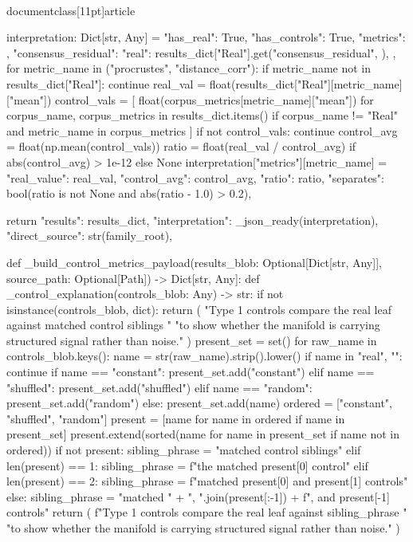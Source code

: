 \\documentclass[11pt]{article}
\begin{document}
\begin{CodeBlock}
    interpretation: Dict[str, Any] = {
        "has_real": True,
        "has_controls": True,
        "metrics": {},
        "consensus_residual": {
            "real": results_dict["Real"].get("consensus_residual", {}),
        },
    }
    for metric_name in ("procrustes", "distance_corr"):
        if metric_name not in results_dict["Real"]:
            continue
        real_val = float(results_dict["Real"][metric_name]["mean"])
        control_vals = [
            float(corpus_metrics[metric_name]["mean"])
            for corpus_name, corpus_metrics in results_dict.items()
            if corpus_name != "Real" and metric_name in corpus_metrics
        ]
        if not control_vals:
            continue
        control_avg = float(np.mean(control_vals))
        ratio = float(real_val / control_avg) if abs(control_avg) > 1e-12 else None
        interpretation["metrics"][metric_name] = {
            "real_value": real_val,
            "control_avg": control_avg,
            "ratio": ratio,
            "separates": bool(ratio is not None and abs(ratio - 1.0) > 0.2),
        }

    return {
        "results": results_dict,
        "interpretation": _json_ready(interpretation),
        "direct_source": str(family_root),
    }


def _build_control_metrics_payload(results_blob: Optional[Dict[str, Any]], source_path: Optional[Path]) -> Dict[str, Any]:
    def _control_explanation(controls_blob: Any) -> str:
        if not isinstance(controls_blob, dict):
            return (
                "Type 1 controls compare the real leaf against matched control siblings "
                "to show whether the manifold is carrying structured signal rather than noise."
            )
        present_set = set()
        for raw_name in controls_blob.keys():
            name = str(raw_name).strip().lower()
            if name in {"real", ""}:
                continue
            if name == "constant":
                present_set.add("constant")
            elif name == "shuffled":
                present_set.add("shuffled")
            elif name == "random":
                present_set.add("random")
            else:
                present_set.add(name)
        ordered = ["constant", "shuffled", "random"]
        present = [name for name in ordered if name in present_set]
        present.extend(sorted(name for name in present_set if name not in ordered))
        if not present:
            sibling_phrase = "matched control siblings"
        elif len(present) == 1:
            sibling_phrase = f"the matched {present[0]} control"
        elif len(present) == 2:
            sibling_phrase = f"matched {present[0]} and {present[1]} controls"
        else:
            sibling_phrase = "matched " + ", ".join(present[:-1]) + f", and {present[-1]} controls"
        return (
            f"Type 1 controls compare the real leaf against {sibling_phrase} "
            "to show whether the manifold is carrying structured signal rather than noise."
        )


\end{CodeBlock}
\end{document}
